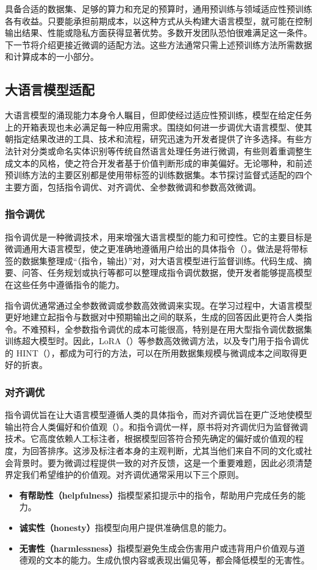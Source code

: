 具备合适的数据集、足够的算力和充足的预算时，通用预训练与领域适应性预训练各有收益。只要能承担前期成本，以这种方式从头构建大语言模型，就可能在控制输出结果、性能或隐私方面获得显著优势。多数开发团队恐怕很难满足这一条件。下一节将介绍更接近微调的适配方法。这些方法通常只需上述预训练方法所需数据和计算成本的一小部分。

\subsection{大语言模型适配}
大语言模型的涌现能力本身令人瞩目，但即使经过适应性预训练，模型在给定任务上的开箱表现也未必满足每一种应用需求。围绕如何进一步调优大语言模型、使其朝指定结果改进的工具、技术和流程，研究迅速为开发者提供了许多选择。有些方法针对分类或命名实体识别等传统自然语言处理任务进行微调，有些则着重调整生成文本的风格，使之符合开发者基于价值判断形成的审美偏好。无论哪种，和前述预训练方法的主要区别都是使用带标签的训练数据集。本节探讨监督式适配的四个主要方面，包括指令调优、对齐调优、全参数微调和参数高效微调。

\subsubsection{指令调优}
指令调优是一种微调技术，用来增强大语言模型的能力和可控性。它的主要目标是微调通用大语言模型，使之更准确地遵循用户给出的具体指令（）。做法是将带标签的数据集整理成“（指令，输出）”对，对大语言模型进行监督训练。代码生成、摘要、问答、任务规划或执行等都可以整理成指令调优数据，使开发者能够提高模型在这些任务中遵循指令的能力。

指令调优通常通过全参数微调或参数高效微调来实现。在学习过程中，大语言模型更好地建立起指令与数据对中预期输出之间的联系，生成的回答因此更符合人类指令。不难预料，全参数指令调优的成本可能很高，特别是在用大型指令调优数据集训练超大模型时。因此，LoRA（）等参数高效微调方法，以及专门用于指令调优的 HINT（），都成为可行的方法，可以在所用数据集规模与微调成本之间取得更好的折衷。

\subsubsection{对齐调优}
指令调优旨在让大语言模型遵循人类的具体指令，而对齐调优旨在更广泛地使模型输出符合人类偏好和价值观（）。和指令调优一样，原书将对齐调优归为监督微调技术。它高度依赖人工标注者，根据模型回答符合预先确定的偏好或价值观的程度，为回答排序。这涉及标注者本身的主观判断，尤其当他们来自不同的文化或社会背景时。要为微调过程提供一致的对齐反馈，这是一个重要难题，因此必须清楚界定我们希望维护的价值观。对齐调优通常采用以下三个原则。
\begin{itemize}
\item \textbf{有帮助性（helpfulness）}指模型紧扣提示中的指令，帮助用户完成任务的能力。
\item \textbf{诚实性（honesty）}指模型向用户提供准确信息的能力。
\item \textbf{无害性（harmlessness）}指模型避免生成会伤害用户或违背用户价值观与道德观的文本的能力。生成仇恨内容或表现出偏见等，都会降低模型的无害性。
\end{itemize}

